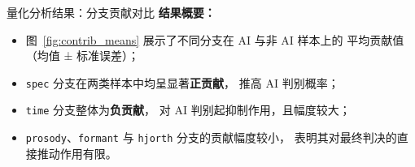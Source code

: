 \documentclass[aspectratio=169]{beamer}
\begin{document}
\begin{frame}{量化分析结果：分支贡献对比}
\textbf{结果概要：}
\begin{itemize}
  \item 图~\ref{fig:contrib_means} 展示了不同分支在 AI 与非 AI 样本上的
        平均贡献值（均值 ± 标准误差）；
  \item \texttt{spec} 分支在两类样本中均呈显著\textbf{正贡献}，
        推高 AI 判别概率；
  \item \texttt{time} 分支整体为\textbf{负贡献}，
        对 AI 判别起抑制作用，且幅度较大；
  \item \texttt{prosody}、\texttt{formant} 与 \texttt{hjorth} 分支的贡献幅度较小，
        表明其对最终判决的直接推动作用有限。
\end{itemize}

\end{frame}
\end{document}

